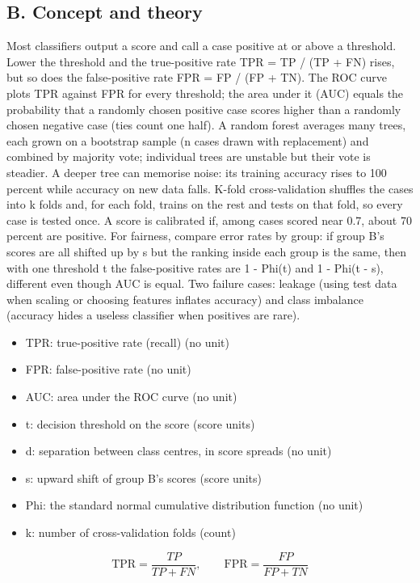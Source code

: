 \documentclass[11pt,a4paper]{article}
\begin{document}
\subsection*{B. Concept and theory}
Most classifiers output a score and call a case positive at or above a threshold. Lower the threshold and the true-positive rate TPR = TP / (TP + FN) rises, but so does the false-positive rate FPR = FP / (FP + TN). The ROC curve plots TPR against FPR for every threshold; the area under it (AUC) equals the probability that a randomly chosen positive case scores higher than a randomly chosen negative case (ties count one half). A random forest averages many trees, each grown on a bootstrap sample (n cases drawn with replacement) and combined by majority vote; individual trees are unstable but their vote is steadier. A deeper tree can memorise noise: its training accuracy rises to 100 percent while accuracy on new data falls. K-fold cross-validation shuffles the cases into k folds and, for each fold, trains on the rest and tests on that fold, so every case is tested once. A score is calibrated if, among cases scored near 0.7, about 70 percent are positive. For fairness, compare error rates by group: if group B's scores are all shifted up by s but the ranking inside each group is the same, then with one threshold t the false-positive rates are 1 - Phi(t) and 1 - Phi(t - s), different even though AUC is equal. Two failure cases: leakage (using test data when scaling or choosing features inflates accuracy) and class imbalance (accuracy hides a useless classifier when positives are rare).

\begin{itemize}[nosep]
\item TPR: true-positive rate (recall) (no unit)
\item FPR: false-positive rate (no unit)
\item AUC: area under the ROC curve (no unit)
\item t: decision threshold on the score (score units)
\item d: separation between class centres, in score spreads (no unit)
\item s: upward shift of group B's scores (score units)
\item Phi: the standard normal cumulative distribution function (no unit)
\item k: number of cross-validation folds (count)
\end{itemize}

\begin{equation*}
\text{TPR}=\frac{TP}{TP+FN},\qquad \text{FPR}=\frac{FP}{FP+TN}
\end{equation*}
\end{document}
